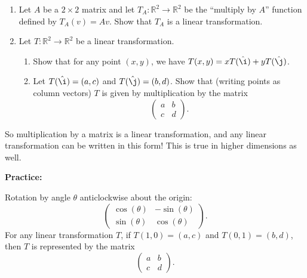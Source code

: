 \documentclass{article}
\newcommand{\ihat}{\hat\i}
\newcommand{\jhat}{\hat\j}
\begin{document}
\begin{enumerate}
	\item Let $A$ be a $2\times 2$ matrix and let $T_A:\mathbb{R}^2\to\mathbb{R}^2$ be the ``multiply by $A$'' function defined by $T_A(v)=Av$. Show that $T_A$ is a linear transformation.
	\item Let $T:\mathbb{R}^2\to\mathbb{R}^2$ be a linear transformation.
		\begin{enumerate}
			\item Show that for any point $(x,y)$, we have $T(x,y)=xT(\ihat)+yT(\jhat)$.
			\item Let $T(\ihat)=(a,c)$ and $T(\jhat)=(b,d)$. Show that (writing points as column vectors) $T$ is given by multiplication by the matrix
				\[\left(\begin{array}{cc} a & b\\c & d\end{array}\right).\]
		\end{enumerate}
\end{enumerate}

So multiplication by a matrix is a linear transformation, and any linear transformation can be written in this form! This is true in higher dimensions as well.


\clearpage

\textbf{Practice:}\bigskip

Rotation by angle $\theta$ anticlockwise about the origin:
\[\left(\begin{array}{cc}\cos(\theta)&-\sin(\theta)\\\sin(\theta)&\cos(\theta)\end{array}\right).\]
For any linear transformation $T$, if $T(1,0)=(a,c)$ and $T(0,1)=(b,d)$, then $T$ is represented by the matrix
\[\left(\begin{array}{cc} a & b\\c & d\end{array}\right).\]
\end{document}
